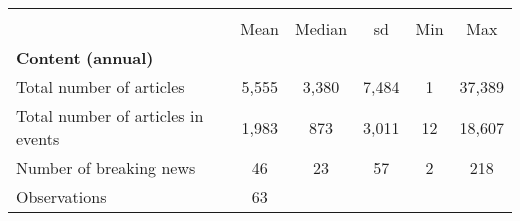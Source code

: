 {
\def\sym#1{\ifmmode^{#1}\else\(^{#1}\)\fi}
\begin{tabular}{l*{1}{ccccc}}
\hline\hline
                    &\multicolumn{5}{c}{}                                            \\
                    &        Mean&      Median&          sd&         Min&         Max\\
\hline
\textbf{Content} \textbf{(annual)}&            &            &            &            &            \\
Total number of articles&       5,555&       3,380&       7,484&           1&      37,389\\
Total number of articles in events&       1,983&         873&       3,011&          12&      18,607\\
Number of breaking news&          46&          23&          57&           2&         218\\
\hline
Observations        &          63&            &            &            &            \\
\hline\hline
\end{tabular}
}
